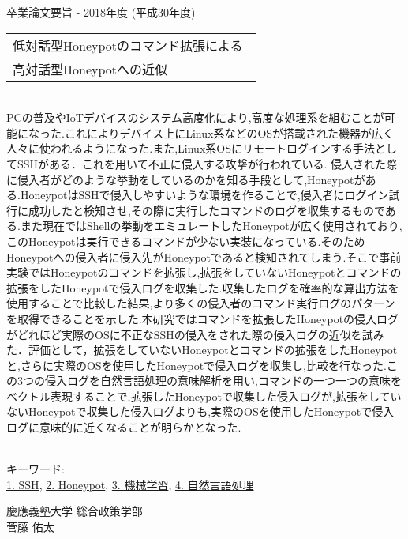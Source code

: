 卒業論文要旨 - 2018年度 (平成30年度)
\begin{center}
\begin{large}
\begin{tabular}{|M{0.97\linewidth}|}
    \hline
   低対話型Honeypotのコマンド拡張による\\高対話型Honeypotへの近似\\
    \hline
\end{tabular}
\end{large}
\end{center}

~ \\

PCの普及やIoTデバイスのシステム高度化により,高度な処理系を組むことが可能になった.これによりデバイス上にLinux系などのOSが搭載された機器が広く人々に使われるようになった.また,Linux系OSにリモートログインする手法としてSSHがある．これを用いて不正に侵入する攻撃が行われている.
侵入された際に侵入者がどのような挙動をしているのかを知る手段として,Honeypotがある.HoneypotはSSHで侵入しやすいような環境を作ることで,侵入者にログイン試行に成功したと検知させ,その際に実行したコマンドのログを収集するものである.また現在ではShellの挙動をエミュレートしたHoneypotが広く使用されており,このHoneypotは実行できるコマンドが少ない実装になっている.そのためHoneypotへの侵入者に侵入先がHoneypotであると検知されてしまう.そこで事前実験ではHoneypotのコマンドを拡張し,拡張をしていないHoneypotとコマンドの拡張をしたHoneypotで侵入ログを収集した.収集したログを確率的な算出方法を使用することで比較した結果,より多くの侵入者のコマンド実行ログのパターンを取得できることを示した.本研究ではコマンドを拡張したHoneypotの侵入ログがどれほど実際のOSに不正なSSHの侵入をされた際の侵入ログの近似を試みた．評価として，拡張をしていないHoneypotとコマンドの拡張をしたHoneypotと,さらに実際のOSを使用したHoneypotで侵入ログを収集し,比較を行なった.この3つの侵入ログを自然言語処理の意味解析を用い,コマンドの一つ一つの意味をベクトル表現することで,拡張したHoneypotで収集した侵入ログが,拡張をしていないHoneypotで収集した侵入ログよりも,実際のOSを使用したHoneypotで侵入ログに意味的に近くなることが明らかとなった.


~ \\
キーワード:\\
\underline{1. SSH},
\underline{2. Honeypot},
\underline{3. 機械学習},
\underline{4. 自然言語処理}
\begin{flushright}
慶應義塾大学 総合政策学部\\
菅藤 佑太
\end{flushright}
